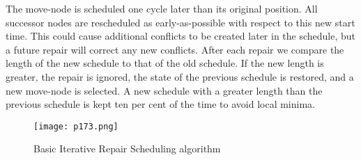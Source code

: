 The move-node is scheduled one cycle later than its original position. All successor nodes are rescheduled
as early-as-possible with respect to this new start time. This could cause additional conflicts to be created
later in the schedule, but a future repair will correct any new conflicts. After each repair we compare the
length of the new schedule to that of the old schedule. If the new length is greater, the repair is ignored,
the state of the previous schedule is restored, and a new move-node is selected. A new schedule with a
greater length than the previous schedule is kept ten per cent of the time to avoid local minima.
\begin{figure}[H]
	\centering
	\texttt{[image: p173.png]}
	\caption{Basic Iterative Repair Scheduling algorithm}
	\label{fig:p173}
\end{figure}
